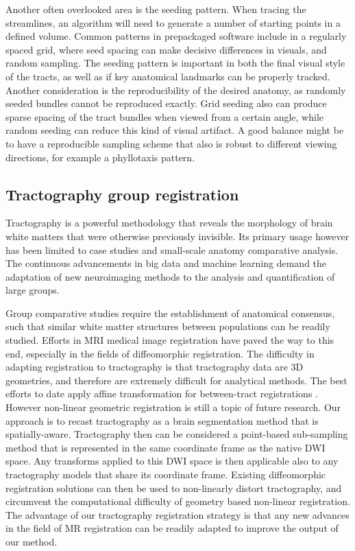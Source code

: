 Another often overlooked area is the seeding pattern. When tracing the streamlines, an algorithm will need to generate a number of starting points in a defined volume. Common patterns in prepackaged software include in a regularly spaced grid, where seed spacing can make decisive differences in visuals, and random sampling. The seeding pattern is important in both the final visual style of the tracts, as well as if key anatomical landmarks can be properly tracked. Another consideration is the reproducibility of the desired anatomy, as randomly seeded bundles cannot be reproduced exactly. Grid seeding also can produce sparse spacing of the tract bundles when viewed from a certain angle, while random seeding can reduce this kind of visual artifact. A good balance might be to have a reproducible sampling scheme that also is robust to different viewing directions, for example a phyllotaxis pattern.

\subsection{Tractography group registration}
Tractography is a powerful methodology that reveals the morphology of brain white matters that were otherwise previously invisible. Its primary usage however has been limited to case studies and small-scale anatomy comparative analysis. The continuous advancements in big data and machine learning demand the adaptation of new neuroimaging methods to the analysis and quantification of large groups.

Group comparative studies require the establishment of anatomical consensus, such that similar white matter structures between populations can be readily studied. Efforts in MRI medical image registration have paved the way to this end, especially in the fields of diffeomorphic registration. The difficulty in adapting registration to tractography is that tractography data are 3D geometries, and therefore are extremely difficult for analytical methods. The best efforts to date apply affine transformation for between-tract registrations \cite{Garyfallidis2015}. However non-linear geometric registration is still a topic of future research. Our approach is to recast tractography as a brain segmentation method that is spatially-aware. Tractography then can be considered a point-based sub-sampling method that is represented in the same coordinate frame as the native DWI space. Any transforms applied to this DWI space is then applicable also to any tractography models that share its coordinate frame. Existing diffeomorphic registration solutions can then be used to non-linearly distort tractography, and circumvent the computational difficulty of geometry based non-linear registration. The advantage of our tractography registration strategy is that any new advances in the field of MR registration can be readily adapted to improve the output of our method. 

